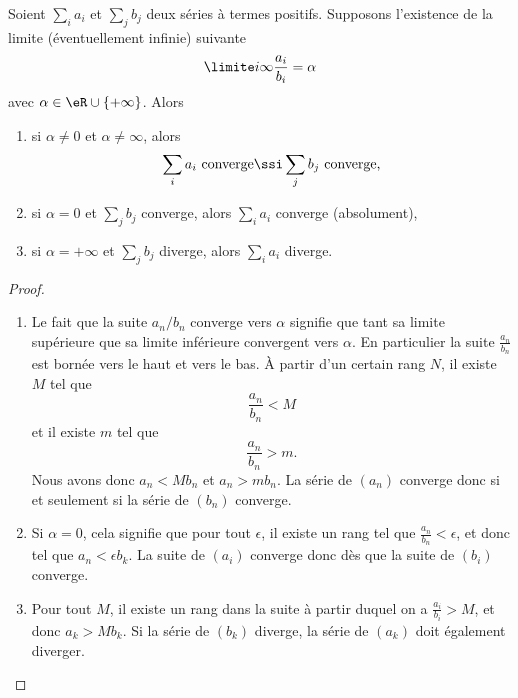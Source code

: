 \begin{proposition}
 Soient $\sum_i a_i$ et $\sum_j b_j$ deux séries à termes positifs. Supposons l'existence de la limite (éventuellement infinie) suivante
\begin{equation}
  \limite i \infty \frac{a_i}{b_i} = \alpha
\end{equation}
avec \( \alpha\in \eR\cup\{ +\infty \}\). Alors
\begin{enumerate}
\item si $\alpha \neq 0$ et $\alpha\neq \infty$, alors
  \begin{equation}
    \sum_i a_i \text{~converge} \ssi \sum_j b_j\text{~converge,}
  \end{equation}
\item si $\alpha = 0$ et $\sum_j b_j$ converge, alors $\sum_i a_i$
  converge (absolument),
\item si $\alpha = +\infty$ et $\sum_j b_j$ diverge, alors $\sum_i
  a_i$ diverge.
\end{enumerate}
\end{proposition}

\begin{proof}
\begin{enumerate}
    \item
        Le fait que la suite $a_n/b_n$ converge vers $\alpha$ signifie que tant sa limite supérieure que sa limite inférieure convergent vers $\alpha$. En particulier la suite $\frac{ a_n }{ b_n }$ est bornée vers le haut et vers le bas. À partir d'un certain rang $N$, il existe $M$ tel que
        \begin{equation}
            \frac{ a_n }{ b_n }<M
        \end{equation}
        et il existe $m$ tel que
        \begin{equation}
            \frac{ a_n }{ b_n }>m.
        \end{equation}
        Nous avons donc $a_n<Mb_n$ et $a_n>mb_n$. La série de $(a_n)$ converge donc si et seulement si la série de $(b_n)$ converge.
    \item
        Si $\alpha=0$, cela signifie que pour tout $\epsilon$, il existe un rang tel que $\frac{ a_n }{ b_n }<\epsilon$, et donc tel que $a_n<\epsilon b_k$. La suite de $(a_i)$ converge donc dès que la suite de $(b_i)$ converge.
    \item
        Pour tout $M$, il existe un rang dans la suite à partir duquel on a $\frac{ a_i }{ b_i }>M$, et donc $a_k>Mb_k$. Si la série de $(b_k)$ diverge, la série de $(a_k)$ doit également diverger.
\end{enumerate}
\end{proof}

